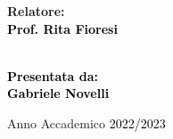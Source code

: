 \documentclass[12pt,a4paper]{report}
\theoremstyle{definition}
\theoremstyle{Theorem}
\theoremstyle{definition}
\theoremstyle{definition}
\theoremstyle{definition}
\begin{document}
\begin{frontespizio}
\begin{titlepage}
			\begin{minipage}[t]{0.47\textwidth}
				{\large{\bf Relatore: \vspace{2mm}\\\textcolor{black}{
							Prof. Rita Fioresi}\\\\
					}}
			\end{minipage}
			\hfill
			\begin{minipage}[t]{0.47\textwidth}\raggedleft \textcolor{black}{
					{\large{\bf Presentata da:
							\vspace{2mm}\\
							Gabriele Novelli}}}
			\end{minipage}
			
			\vspace{40mm}
			
			\begin{center}
				Anno Accademico \textcolor{black}{ 2022/2023}
			\end{center}
			
		\end{titlepage}
		\end{frontespizio}
	\tableofcontents
	\newpage
	\thispagestyle{empty}
	\mbox{}
	\newpage
\end{document}
